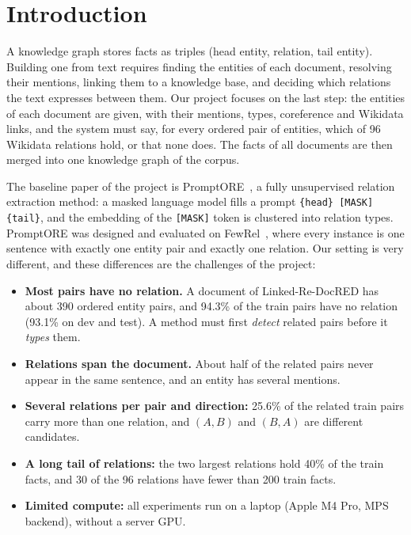 \documentclass[pdflatex,sn-mathphys-num]{sn-jnl}
\begin{document}
\section{Introduction}\label{sec:intro}

A knowledge graph stores facts as triples (head entity, relation, tail entity). Building one from text requires finding the entities of each document, resolving their mentions, linking them to a knowledge base, and deciding which relations the text expresses between them. Our project focuses on the last step: the entities of each document are given, with their mentions, types, coreference and Wikidata links, and the system must say, for every ordered pair of entities, which of 96 Wikidata relations hold, or that none does. The facts of all documents are then merged into one knowledge graph of the corpus.

The baseline paper of the project is PromptORE~\cite{genest2023promptore}, a fully unsupervised relation extraction method: a masked language model fills a prompt \texttt{\{head\} [MASK] \{tail\}}, and the embedding of the \texttt{[MASK]} token is clustered into relation types. PromptORE was designed and evaluated on FewRel~\cite{han2018fewrel}, where every instance is one sentence with exactly one entity pair and exactly one relation. Our setting is very different, and these differences are the challenges of the project:

\begin{itemize}
\item \textbf{Most pairs have no relation.} A document of Linked-Re-DocRED has about 390 ordered entity pairs, and 94.3\% of the train pairs have no relation (93.1\% on dev and test). A method must first \emph{detect} related pairs before it \emph{types} them.
\item \textbf{Relations span the document.} About half of the related pairs never appear in the same sentence, and an entity has several mentions.
\item \textbf{Several relations per pair and direction:} 25.6\% of the related train pairs carry more than one relation, and $(A,B)$ and $(B,A)$ are different candidates.
\item \textbf{A long tail of relations:} the two largest relations hold 40\% of the train facts, and 30 of the 96 relations have fewer than 200 train facts.
\item \textbf{Limited compute:} all experiments run on a laptop (Apple M4 Pro, MPS backend), without a server GPU.
\end{itemize}
\end{document}

